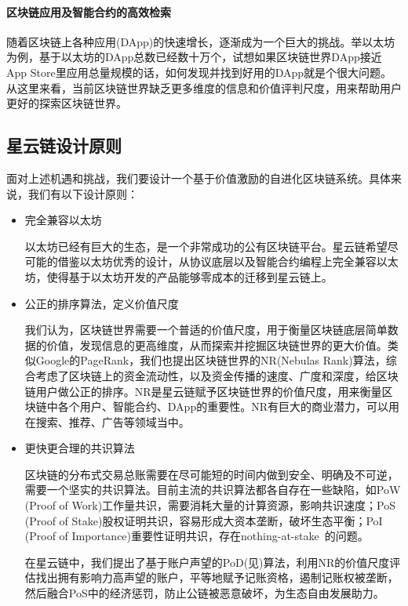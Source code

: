 \paragraph{区块链应用及智能合约的高效检索}随着区块链上各种应用(DApp)的快速增长，逐渐成为一个巨大的挑战。举以太坊为例，基于以太坊的DApp总数已经数十万个，试想如果区块链世界DApp接近App Store里应用总量规模的话，如何发现并找到好用的DApp就是个很大问题。从这里来看，当前区块链世界缺乏更多维度的信息和价值评判尺度，用来帮助用户更好的探索区块链世界。

\subsection{星云链设计原则}
面对上述机遇和挑战，我们要设计一个基于价值激励的自进化区块链系统。具体来说，我们有以下设计原则：
\begin{itemize}
	\item 完全兼容以太坊

以太坊已经有巨大的生态，是一个非常成功的公有区块链平台。星云链希望尽可能的借鉴以太坊优秀的设计，从协议底层以及智能合约编程上完全兼容以太坊，使得基于以太坊开发的产品能够零成本的迁移到星云链上。

	\item 公正的排序算法，定义价值尺度

我们认为，区块链世界需要一个普适的价值尺度，用于衡量区块链底层简单数据的价值，发现信息的更高维度，从而探索并挖掘区块链世界的更大价值。类似Google的PageRank\cite{Brin2010}\cite{page1999pagerank}，我们也提出区块链世界的NR(Nebulas Rank)算法，综合考虑了区块链上的资金流动性，以及资金传播的速度、广度和深度，给区块链用户做公正的排序。NR是星云链赋予区块链世界的价值尺度，用来衡量区块链中各个用户、智能合约、DApp的重要性。NR有巨大的商业潜力，可以用在搜索、推荐、广告等领域当中。

	\item 更快更合理的共识算法

区块链的分布式交易总账需要在尽可能短的时间内做到安全、明确及不可逆，需要一个坚实的共识算法。目前主流的共识算法都各自存在一些缺陷，如PoW (Proof of Work)工作量共识，需要消耗大量的计算资源，影响共识速度；PoS (Proof of Stake)股权证明共识，容易形成大资本垄断，破坏生态平衡；PoI (Proof of Importance)重要性证明共识，存在nothing-at-stake~\cite{nothingatstake}的问题。

在星云链中，我们提出了基于账户声望的PoD(见)算法，利用NR的价值尺度评估找出拥有影响力高声望的账户，平等地赋予记账资格，遏制记账权被垄断，然后融合PoS中的经济惩罚，防止公链被恶意破坏，为生态自由发展助力。


\end{itemize}
